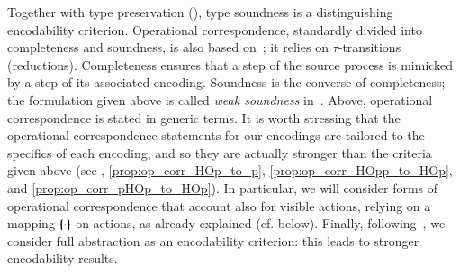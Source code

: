\documentclass[preprint,11pt]{elsarticle}
\begin{document}
{{%
Together with type preservation (), type soundness is a distinguishing encodability criterion.
Operational correspondence, standardly divided into completeness and soundness, is also based
on~\cite{DBLP:journals/iandc/Gorla10};
it relies on 
$\tau$-transitions (reductions).
Completeness ensures that a step of the source process is mimicked
by a step of its associated encoding.
Soundness is the converse of completeness; the formulation given above is called \emph{weak soundness} in~\cite{DBLP:journals/corr/PetersG15}.
{Above, operational correspondence is stated in generic terms.}
It is worth stressing that 
the operational correspondence statements 
for our encodings 
 are tailored to the specifics of each encoding, and so they
 are actually stronger than the criteria given above
 {(see , \ref{prop:op_corr_HOp_to_p}, \ref{prop:op_corr_HOpp_to_HOp}, and \ref{prop:op_corr_pHOp_to_HOp}).}
 In particular, we will consider forms of operational correspondence that account also for visible actions, relying on 
 a mapping $\{\!\!\{\cdot\}\!\!\}$ on actions, as already explained (cf.  below).
Finally, following~\cite{SangiorgiD:expmpa,DBLP:conf/lics/PalamidessiSVV06,Yoshida96},
we consider full abstraction as an encodability criterion: this leads to 
stronger encodability results. 

}}
\end{document}
